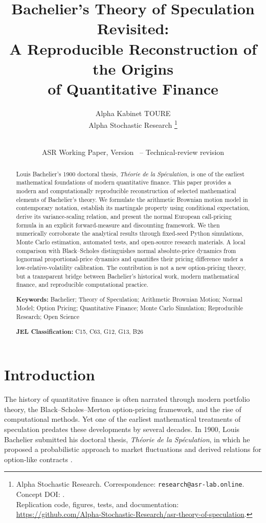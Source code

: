 \documentclass[11pt,a4paper]{article}
\title{\textbf{Bachelier's Theory of Speculation Revisited:\\
A Reproducible Reconstruction of the Origins\\
of Quantitative Finance}}
\author{
Alpha Kabinet TOURE\\
\normalsize Alpha Stochastic Research
\thanks{%
Alpha Stochastic Research. Correspondence: \texttt{research@asr-lab.online}.\\
Concept DOI: \href{https://doi.org/\ConceptDOI}{\ConceptDOI}.\\
Replication code, figures, tests, and documentation:
\url{https://github.com/Alpha-Stochastic-Research/asr-theory-of-speculation}.%
}
}
\date{\PaperDate\\[3pt]
\small ASR Working Paper, Version \PaperVersion\ -- Technical-review revision}
\begin{document}
\maketitle
\thispagestyle{empty}

\begin{abstract}
\noindent
Louis Bachelier's 1900 doctoral thesis, \emph{Th\'eorie de la Sp\'eculation}, is one of the earliest mathematical foundations of modern quantitative finance. This paper provides a modern and computationally reproducible reconstruction of selected mathematical elements of Bachelier's theory. We formulate the arithmetic Brownian motion model in contemporary notation, establish its martingale property using conditional expectation, derive its variance-scaling relation, and present the normal European call-pricing formula in an explicit forward-measure and discounting framework. We then numerically corroborate the analytical results through fixed-seed Python simulations, Monte Carlo estimation, automated tests, and open-source research materials. A local comparison with Black--Scholes distinguishes normal absolute-price dynamics from lognormal proportional-price dynamics and quantifies their pricing difference under a low-relative-volatility calibration. The contribution is not a new option-pricing theory, but a transparent bridge between Bachelier's historical work, modern mathematical finance, and reproducible computational practice.

\vspace{6pt}
\noindent\textbf{Keywords:} Bachelier; Theory of Speculation; Arithmetic Brownian Motion; Normal Model; Option Pricing; Quantitative Finance; Monte Carlo Simulation; Reproducible Research; Open Science

\vspace{4pt}
\noindent\textbf{JEL Classification:} C15, C63, G12, G13, B26
\end{abstract}

\newpage
\setcounter{page}{1}

\section{Introduction}

The history of quantitative finance is often narrated through modern portfolio theory, the Black--Scholes--Merton option-pricing framework, and the rise of computational methods. Yet one of the earliest mathematical treatments of speculation predates these developments by several decades. In 1900, Louis Bachelier submitted his doctoral thesis, \emph{Th\'eorie de la Sp\'eculation}, in which he proposed a probabilistic approach to market fluctuations and derived relations for option-like contracts \citep{bachelier1900}.
\end{document}
